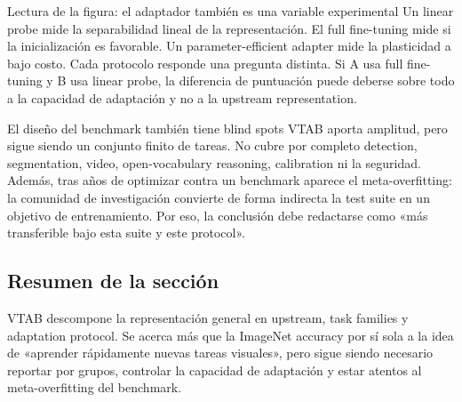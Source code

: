 
\begin{knowledgebox}{Lectura de la figura: el adaptador también es una variable experimental}
Un linear probe mide la separabilidad lineal de la representación. El full fine-tuning mide si la inicialización es favorable. Un parameter-efficient adapter mide la plasticidad a bajo costo. Cada protocolo responde una pregunta distinta. Si A usa full fine-tuning y B usa linear probe, la diferencia de puntuación puede deberse sobre todo a la capacidad de adaptación y no a la upstream representation.
\end{knowledgebox}

\begin{warningbox}{El diseño del benchmark también tiene blind spots}
VTAB aporta amplitud, pero sigue siendo un conjunto finito de tareas. No cubre por completo detection, segmentation, video, open-vocabulary reasoning, calibration ni la seguridad. Además, tras años de optimizar contra un benchmark aparece el meta-overfitting: la comunidad de investigación convierte de forma indirecta la test suite en un objetivo de entrenamiento. Por eso, la conclusión debe redactarse como «más transferible bajo esta suite y este protocol».
\end{warningbox}


\subsection{Resumen de la sección}

VTAB descompone la representación general en upstream, task families y adaptation protocol. Se acerca más que la ImageNet accuracy por sí sola a la idea de «aprender rápidamente nuevas tareas visuales», pero sigue siendo necesario reportar por grupos, controlar la capacidad de adaptación y estar atentos al meta-overfitting del benchmark.

